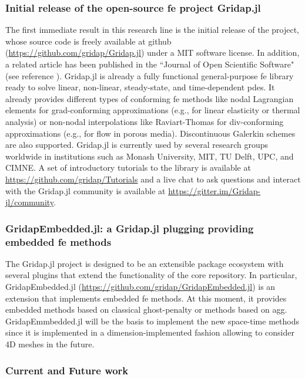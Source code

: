 \documentclass{article}
\begin{document}
\subsubsection{Initial release of the open-source \ac{fe} project Gridap.jl} 

The first immediate result in this research line is the initial release of the project, whose source code is freely available at github (\url{https://github.com/gridap/Gridap.jl}) under a MIT software license. In addition, a related article  {has been published in the ``Journal of Open Scientific Software"} (see reference \cite{badia_2020b}). Gridap.jl is already a fully functional general-purpose \ac{fe} library ready to solve linear, non-linear, steady-state, and time-dependent \acp{pde}. It already provides different types of conforming \ac{fe} methods like nodal Lagrangian elements for grad-conforming approximations (e.g., for linear elasticity or thermal analysis) or non-nodal interpolations like Raviart-Thomas for div-conforming approximations (e.g., for flow in porous media). Discontinuous Galerkin schemes are also supported. Gridap.jl is currently used by several research groups worldwide in institutions such as Monash University, MIT, TU Delft, UPC, and CIMNE. A set of introductory tutorials to the library is available at \url{https://github.com/gridap/Tutorials} and a live chat to ask questions and interact with the Gridap.jl community is available at \url{https://gitter.im/Gridap-jl/community}.

\subsubsection{GridapEmbedded.jl: a Gridap.jl plugging providing embedded \ac{fe} methods}

The Gridap.jl project is designed to be an extensible package ecosystem with several plugins that extend the functionality of the core repository. In particular, GridapEmbedded.jl (\url{https://github.com/gridap/GridapEmbedded.jl}) is an extension that implements embedded \ac{fe} methods. At this moment, it provides embedded methods based on classical ghost-penalty  or methods based on \ac{agg}. GridapEmmbedded.jl will be the basis to implement the new space-time methods since it is implemented in a dimension-implemented fashion allowing to consider 4D meshes in the future. 

\subsubsection{Current and Future work}
 
\end{document}
